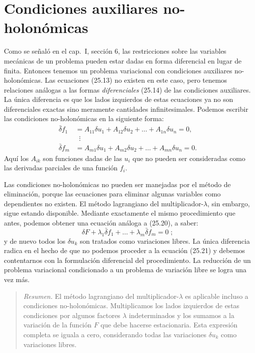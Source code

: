 \documentclass[12pt,a4paper]{book}
\begin{document}
\section{Condiciones auxiliares no-holonómicas}

Como se señaló en el cap.\ I, sección 6, las restricciones sobre las variables mecánicas de un problema pueden estar dadas en forma diferencial en lugar de finita. Entonces tenemos un problema variacional con condiciones auxiliares no-holonómicas. Las ecuaciones (25.13) no existen en este caso, pero tenemos relaciones análogas a las formas \textit{diferenciales} (25.14) de las condiciones auxiliares. La única diferencia es que los lados izquierdos de estas ecuaciones ya no son diferenciales exactas sino meramente cantidades infinitesimales. Podemos escribir las condiciones no-holonómicas en la siguiente forma:
\begin{equation}
\begin{aligned}
\bar{\delta} f_1 &= A_{11}\delta u_1 + A_{12}\delta u_2 + \ldots + A_{1n}\delta u_n = 0, \\
&\;\;\vdots \hspace{5cm} \tag{26.1} \\
\bar{\delta} f_m &= A_{m1}\delta u_1 + A_{m2}\delta u_2 + \ldots + A_{mn}\delta u_n = 0.
\end{aligned}
\end{equation}
Aquí los $A_{ik}$ son funciones dadas de las $u_i$ que no pueden ser consideradas como las derivadas parciales de una función $f_i$.

Las condiciones no-holonómicas no pueden ser manejadas por el método de eliminación, porque las ecuaciones para eliminar algunas variables como dependientes no existen. El método lagrangiano del multiplicador-$\lambda$, sin embargo, sigue estando disponible. Mediante exactamente el mismo procedimiento que antes, podemos obtener una ecuación análoga a (25.20), a saber:
\begin{equation}
\delta F + \lambda_1 \bar{\delta} f_1 + \ldots + \lambda_m \bar{\delta} f_m = 0 \; ; \tag{26.2}
\end{equation}
y de nuevo todos los $\delta u_k$ son tratados como variaciones libres. La única diferencia radica en el hecho de que no podemos proceder a la ecuación (25.21) y debemos contentarnos con la formulación diferencial del procedimiento. La reducción de un problema variacional condicionado a un problema de variación libre se logra una vez más.

\begin{quote}
\textit{Resumen.} El método lagrangiano del multiplicador-$\lambda$ es aplicable incluso a condiciones no-holonómicas. Multiplicamos los lados izquierdos de estas condiciones por algunos factores $\lambda$ indeterminados y los sumamos a la variación de la función $F$ que debe hacerse estacionaria. Esta expresión completa se iguala a cero, considerando todas las variaciones $\delta u_k$ como variaciones libres.
\end{quote}
\end{document}
